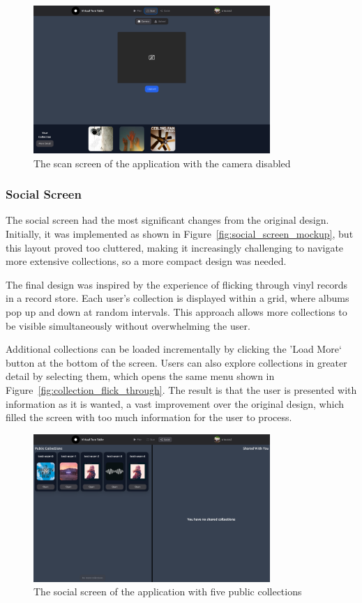 \begin{figure} [H]
    \centering
    \includegraphics[width=0.8\textwidth]{figures/scan_screen.png}
    \caption{The scan screen of the application with the camera disabled}
    \label{fig:scan_screen}
\end{figure}

\subsubsection{Social Screen}
The social screen had the most significant changes from the original design. Initially, it was implemented as shown in Figure~\ref{fig:social_screen_mockup}, but this layout proved too cluttered, making it increasingly challenging to navigate more extensive collections, so a more compact design was needed.

The final design was inspired by the experience of flicking through vinyl records in a record store. Each user's collection is displayed within a grid, where albums pop up and down at random intervals. This approach allows more collections to be visible simultaneously without overwhelming the user.

Additional collections can be loaded incrementally by clicking the 'Load More` button at the bottom of the screen. Users can also explore collections in greater detail by selecting them, which opens the same menu shown in Figure~\ref{fig:collection_flick_through}. The result is that the user is presented with information as it is wanted, a vast improvement over the original design, which filled the screen with too much information for the user to process.

\begin{figure} [H]
    \centering
    \includegraphics[width=0.8\textwidth]{figures/social_screen.png}
    \caption{The social screen of the application with five public collections}
    \label{fig:social screen}
\end{figure}

